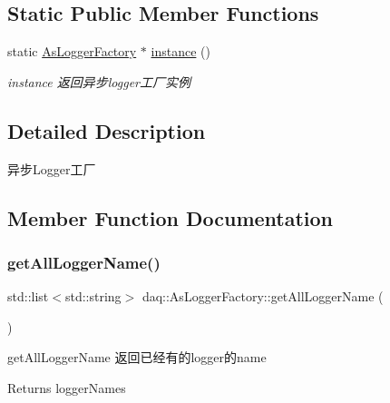 \subsection*{Static Public Member Functions}
\begin{DoxyCompactItemize}
\item 
static \hyperlink{classdaq_1_1AsLoggerFactory}{As\+Logger\+Factory} $\ast$ \hyperlink{classdaq_1_1AsLoggerFactory_ace89aa0c85eba3e23361db48de2f7fc5}{instance} ()
\begin{DoxyCompactList}\small\item\em instance 返回异步logger工厂实例 \end{DoxyCompactList}\end{DoxyCompactItemize}


\subsection{Detailed Description}
异步\+Logger工厂 

\subsection{Member Function Documentation}
\mbox{\label{classdaq_1_1AsLoggerFactory_aa25c05ec2b0c3f459b17e8cf602e40cb}} 
\subsubsection{\texorpdfstring{get\+All\+Logger\+Name()}{getAllLoggerName()}}
{\footnotesize\ttfamily std\+::list$<$std\+::string$>$ daq\+::\+As\+Logger\+Factory\+::get\+All\+Logger\+Name (\begin{DoxyParamCaption}{ }\end{DoxyParamCaption})}



get\+All\+Logger\+Name 返回已经有的logger的name 

\begin{DoxyReturn}{Returns}
logger\+Names 
\end{DoxyReturn}
\mbox{\label{classdaq_1_1AsLoggerFactory_aed827f37657c287c120cddce8868256b}} 
